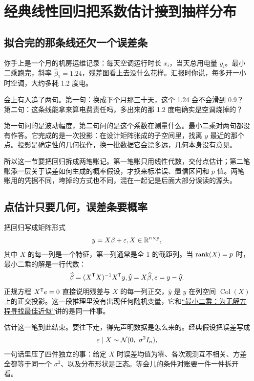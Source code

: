 \section{经典线性回归把系数估计接到抽样分布}
\label{sec:11-Mathematical-Statistics/08-Regression-and-ANOVA/01}

\subsection{拟合完的那条线还欠一个误差条}

你手上是一个月的机房运维记录：每天空调运行时长 \(x_i\)，当天总用电量 \(y_i\)。最小二乘跑完，斜率 \(\widehat\beta_1 = 1.24\)，残差图看上去没什么花样。汇报时你说，每多开一小时空调，大约多耗 1.2 度电。

会上有人追了两句。第一句：换成下个月那三十天，这个 1.24 会不会滑到 0.9？第二句：这条线能拿来算电费责任吗，多出来的那 1.2 度电确实是空调烧掉的？

第一句问的是波动幅度，第二句问的是这个系数在测量什么。最小二乘对两句都没有作答。它完成的是一次投影：在设计矩阵张成的子空间里，找离 \(y\) 最近的那个点。投影是确定性的几何操作，换一批数据它会漂多远，几何本身没有意见。

所以这一节要把回归拆成两笔账记。第一笔账只用线性代数，交付点估计；第二笔账添一层关于误差如何生成的概率假设，才换来标准误、置信区间和 \(p\) 值。两笔账用的凭据不同，垮掉的方式也不同，混在一起记是后面大部分误读的源头。

\subsection{点估计只要几何，误差条要概率}

把回归写成矩阵形式
\[
y = X\beta + \varepsilon,\space X \in \mathbb{R}^{n\times p},
\]
其中 \(X\) 的每一列是一个特征，第一列通常是全 1 的截距列。当 \(\operatorname{rank}(X) = p\) 时，最小二乘的解是一行代数：
\[
\widehat\beta = (X^{\mathsf{T}}X)^{-1}X^{\mathsf{T}}y,\space
\widehat y = X\widehat\beta,\space
e = y - \widehat y .
\]
正规方程 \(X^{\mathsf{T}}e = 0\) 直接说明残差与 \(X\) 的每一列正交，\(\widehat y\) 是 \(y\) 在列空间 \(\operatorname{Col}(X)\) 上的正交投影。这一段推理里没有出现任何随机变量，它和\hyperref[sec:03-Linear-Algebra/03-Orthogonality/03]{``最小二乘：为无解方程寻找最佳近似''}讲的是同一件事。

估计这一笔到此结束。要往下走，得先声明数据是怎么来的。经典假设把误差写成
\[
\varepsilon \given X \sim \mathcal{N}(0,\ \sigma^2 I_n),
\]
一句话里压了四件独立的事：给定 \(X\) 时误差均值为零、各次观测互不相关、方差全都等于同一个 \(\sigma^2\)、以及分布形状是正态。等会儿的条件对账要一件一件拆开看。


